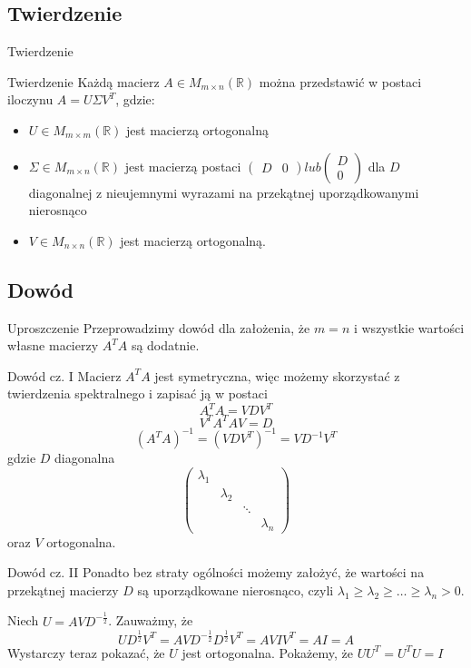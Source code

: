 \documentclass{beamer}
\begin{document}
\subsection{Twierdzenie}
\begin{frame}{Twierdzenie}
    \begin{block}{Twierdzenie}
    Każdą macierz $A \in M_{m \times n} (\mathbb{R})$ można przedstawić w postaci iloczynu $A = U \Sigma V^T$, gdzie: \pause
\begin{itemize}
    \item $U \in M_{m \times m} (\mathbb{R})$ jest macierzą ortogonalną
    \item $\Sigma \in M_{m \times n} (\mathbb{R})$ jest macierzą postaci $\begin{pmatrix} D & 0 \end{pmatrix} lub \begin{pmatrix} D \\ 0 \end{pmatrix}$ dla $D$ diagonalnej z nieujemnymi wyrazami na przekątnej uporządkowanymi nierosnąco 
    \item $V \in M_{n \times n} (\mathbb{R})$ jest macierzą ortogonalną.
\end{itemize}
    \end{block}
\end{frame}

\subsection{Dowód}
\begin{frame}{Uproszczenie}
Przeprowadzimy dowód dla założenia, że $m =n$ i wszystkie wartości własne macierzy $A^TA$ są dodatnie.
\end{frame}

\begin{frame}{Dowód cz. I}
Macierz $A^TA$ jest symetryczna, więc możemy skorzystać z twierdzenia spektralnego i zapisać ją w postaci  $$A^TA = VDV^T$$
$$V^TA^TAV = D $$
$$ (A^TA)^{-1} = (VDV^T)^{-1} = VD^{-1}V^T $$gdzie $D$ diagonalna
$$ \begin{pmatrix}
\lambda_1 & & & \\
 & \lambda_2 & & \\
 & & \ddots & \\
 & & & \lambda_n
\end{pmatrix}$$
oraz $V$ ortogonalna. 

\end{frame}

\begin{frame}{Dowód cz. II}
    Ponadto bez straty ogólności możemy założyć, że wartości na przekątnej macierzy $D$ są uporządkowane nierosnąco, czyli $\lambda_1 \geq  \lambda_2 \geq \ldots \geq \lambda_n > 0 $.
    
    Niech $U = AVD^{-\frac{1}{2}}$. Zauważmy, że $$UD^{\frac{1}{2}}V^T = AVD^{-\frac{1}{2}} D^\frac{1}{2} V^T = A V I V^T = A I = A$$
    Wystarczy teraz pokazać, że $U$ jest ortogonalna. Pokażemy, że $UU^T=U^TU = I$
\end{frame}
\end{document}
